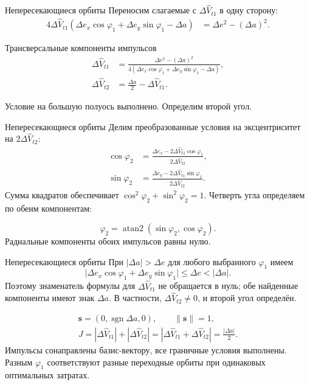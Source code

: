 \documentclass[11pt,aspectratio=169,t]{beamer}
\newcommand{\derivationmathspacing}{%
  \setlength{\abovedisplayskip}{2pt}%
  \setlength{\belowdisplayskip}{3pt}%
  \setlength{\abovedisplayshortskip}{2pt}%
  \setlength{\belowdisplayshortskip}{2pt}%
  \setlength{\jot}{2pt}}
\begin{document}
\begin{frame}{Непересекающиеся орбиты}
\relax
\derivationmathspacing
Переносим слагаемые с $\Delta\widehat V_{t1}$ в одну сторону:
\[
\begin{aligned}
 4\Delta\widehat V_{t1}
  (\Delta e_x\cos\varphi_1+\Delta e_y\sin\varphi_1-\Delta a)
   &=\Delta e^2-(\Delta a)^2.
\end{aligned}
\]
\begin{block}{Трансверсальные компоненты импульсов}
\[
\begin{aligned}
 \Delta\widehat V_{t1}
   &=\frac{\Delta e^2-(\Delta a)^2}
       {4(\Delta e_x\cos\varphi_1+\Delta e_y\sin\varphi_1-\Delta a)},\\[3pt]
 \Delta\widehat V_{t2}
   &=\frac{\Delta a}{2}-\Delta\widehat V_{t1}.
\end{aligned}
\]
\end{block}
\justifying
Условие на большую полуось выполнено. Определим второй угол.
\end{frame}

\begin{frame}{Непересекающиеся орбиты}
\relax
\derivationmathspacing
Делим преобразованные условия на эксцентриситет на
$2\Delta\widehat V_{t2}$:
\[
\boxed{\begin{aligned}
 \cos\varphi_2
   &=\frac{\Delta e_x-2\Delta\widehat V_{t1}\cos\varphi_1}
       {2\Delta\widehat V_{t2}},\\[3pt]
 \sin\varphi_2
   &=\frac{\Delta e_y-2\Delta\widehat V_{t1}\sin\varphi_1}
       {2\Delta\widehat V_{t2}}.
\end{aligned}}
\]
\justifying
Сумма квадратов обеспечивает $\cos^2\varphi_2+\sin^2\varphi_2=1$.
Четверть угла определяем по обеим компонентам:
\par
\[
 \varphi_2=\operatorname{atan2}(\sin\varphi_2,\cos\varphi_2).
\]
Радиальные компоненты обоих импульсов равны нулю.
\end{frame}

\begin{frame}{Непересекающиеся орбиты}
\relax
\derivationmathspacing
При $|\Delta a|>\Delta e$ для любого выбранного $\varphi_1$ имеем
\[
 \bigl|\Delta e_x\cos\varphi_1+\Delta e_y\sin\varphi_1\bigr|
 \leq\Delta e<|\Delta a|.
\]
\justifying
Поэтому знаменатель формулы для $\Delta\widehat V_{t1}$
не обращается в нуль; обе найденные компоненты имеют знак $\Delta a$.
В частности, $\Delta\widehat V_{t2}\ne0$, и второй угол определён.
\par\medskip
\[
\begin{gathered}
 \boldsymbol s=(0,\operatorname{sgn}\Delta a,0),\qquad
 \|\boldsymbol s\|=1,\\[2pt]
 J=|\Delta\widehat V_{t1}|+|\Delta\widehat V_{t2}|
   =\left|\Delta\widehat V_{t1}+\Delta\widehat V_{t2}\right|
   =\frac{|\Delta a|}{2}.
\end{gathered}
\]
\justifying
Импульсы сонаправлены базис-вектору, все граничные условия выполнены.
Разным $\varphi_1$ соответствуют разные переходные орбиты
при одинаковых оптимальных затратах.
\end{frame}
\end{document}
